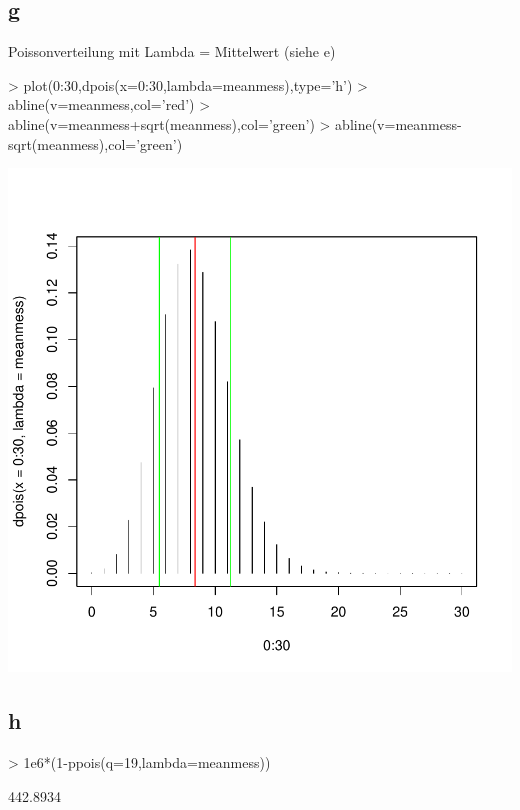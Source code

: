 \subsection{g}
Poissonverteilung mit Lambda = Mittelwert (siehe e)
\begin{Schunk}
\begin{Sinput}
> plot(0:30,dpois(x=0:30,lambda=meanmess),type='h')
> abline(v=meanmess,col='red')
> abline(v=meanmess+sqrt(meanmess),col='green')
> abline(v=meanmess-sqrt(meanmess),col='green')
\end{Sinput}
\end{Schunk}
\includegraphics{sw10_1-008}

\subsection{h}
\begin{Schunk}
\begin{Sinput}
> 1e6*(1-ppois(q=19,lambda=meanmess))
\end{Sinput}
\begin{Soutput}
[1] 442.8934
\end{Soutput}
\end{Schunk}

